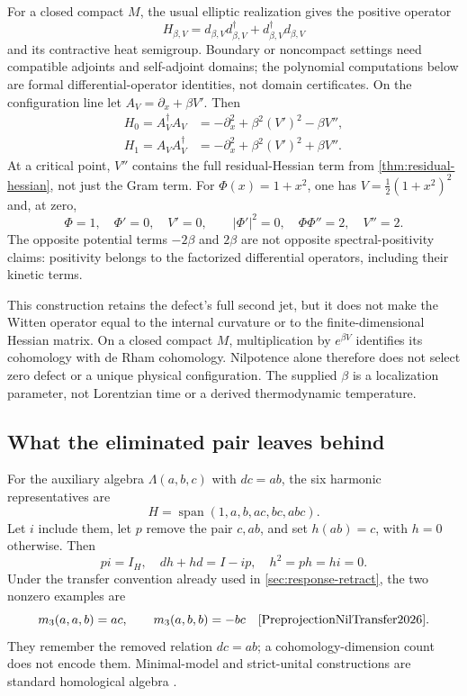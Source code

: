\documentclass[11pt,a4paper]{article}
\begin{document}
For a closed compact \(M\), the usual elliptic realization gives the
positive operator
\[
 H_{\beta,V}=d_{\beta,V}d_{\beta,V}^{\dagger}
            +d_{\beta,V}^{\dagger}d_{\beta,V}
\]
and its contractive heat semigroup. Boundary or noncompact settings need
compatible adjoints and self-adjoint domains; the polynomial computations
below are formal differential-operator identities, not domain certificates.
On the configuration line let \(A_V=\partial_x+\beta V'\). Then
\begin{align*}
 H_0=A_V^\dagger A_V&=-\partial_x^2+\beta^2(V')^2-\beta V'',\\
 H_1=A_V A_V^\dagger&=-\partial_x^2+\beta^2(V')^2+\beta V''.
\end{align*}
At a critical point, \(V''\) contains the full residual-Hessian term from
\cref{thm:residual-hessian}, not just the Gram term. For
\(\Phi(x)=1+x^2\), one has \(V=\frac12(1+x^2)^2\) and, at zero,
\[
 \Phi=1,\quad \Phi'=0,\quad V'=0,\qquad
 |\Phi'|^2=0,\quad \Phi\Phi''=2,\quad V''=2.
\]
The opposite potential terms \(-2\beta\) and \(2\beta\) are not opposite
spectral-positivity claims: positivity belongs to the factorized
differential operators, including their kinetic terms.

This construction retains the defect's full second jet, but it does not
make the Witten operator equal to the internal curvature or to the
finite-dimensional Hessian matrix. On a closed compact \(M\), multiplication
by \(e^{\beta V}\) identifies its cohomology with de Rham cohomology.
Nilpotence alone therefore does not select zero defect or a unique
physical configuration. The supplied \(\beta\) is a localization parameter,
not Lorentzian time or a derived thermodynamic temperature.

\subsection{What the eliminated pair leaves behind}
\label{sec:nil-minimal-model}
For the auxiliary algebra \(\Lambda(a,b,c)\) with \(dc=ab\), the six
harmonic representatives are
\[
 H=\operatorname{span}(1,a,b,ac,bc,abc).
\]
Let \(i\) include them, let \(p\) remove the pair \(c,ab\), and set
\(h(ab)=c\), with \(h=0\) otherwise. Then
\[
 pi=I_H,\quad dh+hd=I-ip,\quad h^2=ph=hi=0.
\]
Under the transfer convention already used in
\cref{sec:response-retract}, the two nonzero examples are
\[
 m_3(a,a,b)=ac,\qquad m_3(a,b,b)=-bc
 \quad\cite{PreprojectionNilTransfer2026}.
\]
They remember the removed relation \(dc=ab\); a cohomology-dimension count
does not encode them. Minimal-model and strict-unital constructions are
standard homological algebra \cite{KellerAInfinity2001,BurkeUnital2018}.
\end{document}

